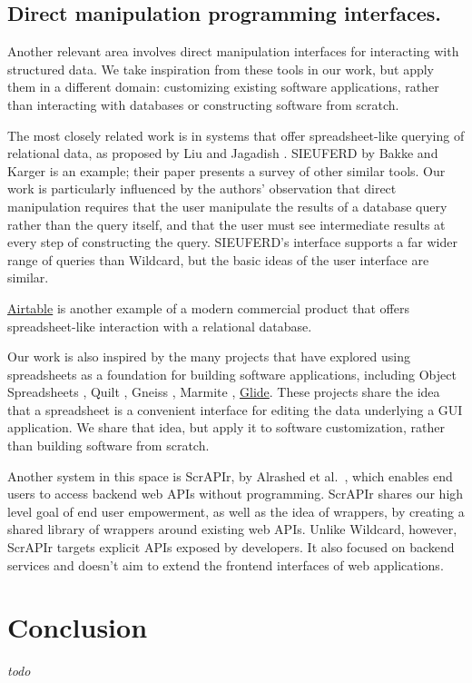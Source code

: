 \documentclass[sigplan,10pt,anonymous,review]{acmart}
\begin{document}
\hypertarget{direct-manipulation-programming-interfaces.}{%
\subsection{Direct manipulation programming
interfaces.}\label{direct-manipulation-programming-interfaces.}}

Another relevant area involves direct manipulation interfaces for
interacting with structured data. We take inspiration from these tools
in our work, but apply them in a different domain: customizing existing
software applications, rather than interacting with databases or
constructing software from scratch.

The most closely related work is in systems that offer spreadsheet-like
querying of relational data, as proposed by Liu and Jagadish
\citep{liu2009}. SIEUFERD by Bakke and Karger \citep{bakke2016} is an
example; their paper presents a survey of other similar tools. Our work
is particularly influenced by the authors' observation that direct
manipulation requires that the user manipulate the results of a database
query rather than the query itself, and that the user must see
intermediate results at every step of constructing the query. SIEUFERD's
interface supports a far wider range of queries than Wildcard, but the
basic ideas of the user interface are similar.

\href{https://airtable.com/}{Airtable} is another example of a modern
commercial product that offers spreadsheet-like interaction with a
relational database.

Our work is also inspired by the many projects that have explored using
spreadsheets as a foundation for building software applications,
including Object Spreadsheets \citep{mccutchen2016}, Quilt
\citep{benson2014}, Gneiss \citep{chang2014}, Marmite \citep{wong2007},
\href{https://www.glideapps.com/}{Glide}. These projects share the idea
that a spreadsheet is a convenient interface for editing the data
underlying a GUI application. We share that idea, but apply it to
software customization, rather than building software from scratch.

Another system in this space is ScrAPIr, by Alrashed et
al.~\citep{alrashed2020}, which enables end users to access backend web
APIs without programming. ScrAPIr shares our high level goal of end user
empowerment, as well as the idea of wrappers, by creating a shared
library of wrappers around existing web APIs. Unlike Wildcard, however,
ScrAPIr targets explicit APIs exposed by developers. It also focused on
backend services and doesn't aim to extend the frontend interfaces of
web applications.

\hypertarget{conclusion}{%
\section{Conclusion}\label{conclusion}}

\emph{todo}



\end{document}
